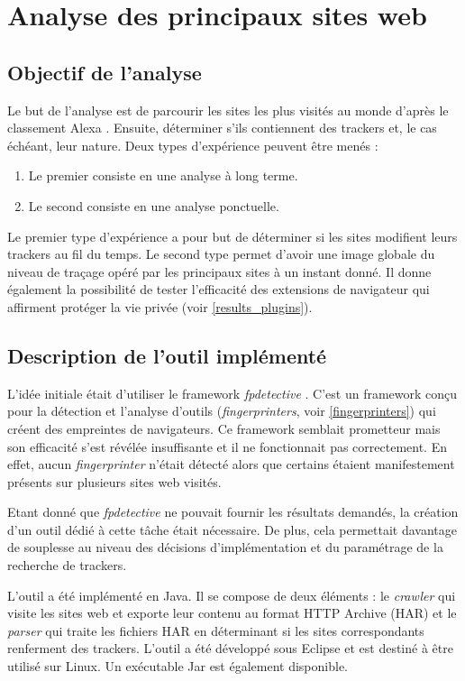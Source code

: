 \chapter{Analyse des principaux sites web}
\section{Objectif de l'analyse}
Le but de l'analyse est de parcourir les sites les plus visités au monde d'après le classement Alexa \cite{AlexaTop}. Ensuite, déterminer s'ils contiennent des trackers et, le cas échéant, leur nature. Deux types d'expérience peuvent être menés :
\begin{enumerate}
	\item Le premier consiste en une analyse à long terme.
	\item Le second consiste en une analyse ponctuelle.
\end{enumerate}

Le premier type d'expérience a pour but de déterminer si les sites modifient leurs trackers au fil du temps.
Le second type permet d'avoir une image globale du niveau de traçage opéré par les principaux sites à un instant donné. Il donne également la possibilité de tester l'efficacité des extensions de navigateur qui affirment protéger la vie privée (voir \autoref{results_plugins}).

\section{Description de l'outil implémenté}
L'idée initiale était d'utiliser le framework \textit{fpdetective} \cite{Acar:2013:FDW:2508859.2516674}. C'est un framework conçu pour la détection et l'analyse d'outils (\textit{fingerprinters}, voir \autoref{fingerprinters}) qui créent des empreintes de navigateurs. Ce framework semblait prometteur mais son efficacité s'est révélée insuffisante et il ne fonctionnait pas correctement. En effet, aucun \textit{fingerprinter} n'était détecté alors que certains étaient manifestement présents sur plusieurs sites web visités.

Etant donné que \textit{fpdetective} ne pouvait fournir les résultats demandés, la création d'un outil dédié à cette tâche était nécessaire. De plus, cela permettait davantage de souplesse au niveau des décisions d'implémentation et du paramétrage de la recherche de trackers.
\newline

L'outil a été implémenté en Java. Il se compose de deux éléments : le \textit{crawler} qui visite les sites web et exporte leur contenu au format HTTP Archive (HAR) et le \textit{parser} qui traite les fichiers HAR en déterminant si les sites correspondants renferment des trackers.
L'outil a été développé sous Eclipse et est destiné à être utilisé sur Linux. Un exécutable Jar est également disponible.
\newline

